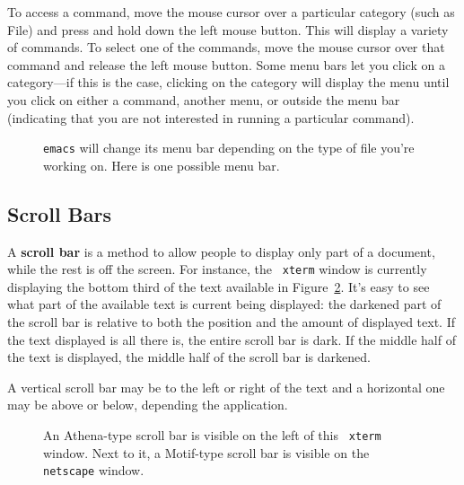 To access a command, move the mouse cursor over a particular category
(such as {\sf File}) and press and hold down the left mouse button.
This will display a variety of commands.  To select one of the
commands, move the mouse cursor over that command and release the left
mouse button.  Some menu bars let you click on a category---if this is
the case, clicking on the category will display the menu until you
click on either a command, another menu, or outside the menu bar
(indicating that you are not interested in running a particular
command).

\begin{figure}[tb]
\begin{center}
\end{center}
\caption{{\tt emacs} will change its menu bar depending on the type of
  file you're working on.  Here is one possible menu
  bar.}\label{x11-menu-bar}
\end{figure}

\subsection{Scroll Bars}\label{x-scroll-bar}

A {\bf scroll bar} is a method to allow people to display only part of
a document, while the rest is off the screen.  For instance, the {\tt
  xterm} window is currently displaying the bottom third of the text
available in Figure~\ref{x11-scrollbar}.  It's easy to see what part
of the available text is current being displayed: the darkened part of
the scroll bar is relative to both the position and the amount of
displayed text.  If the text displayed is all there is, the entire
scroll bar is dark.  If the middle half of the text is displayed, the
middle half of the scroll bar is darkened.

A vertical scroll bar may be to the left or right of the text and a
horizontal one may be above or below, depending the application.

\begin{figure}[tb]
\begin{center}
 \hspace{0.7in}
\end{center}
\caption{An Athena-type scroll bar is visible on the left of this {\tt
    xterm} window.  Next to it, a Motif-type scroll bar is visible on
  the {\tt netscape} window.}\label{x11-scrollbar}
\end{figure}


